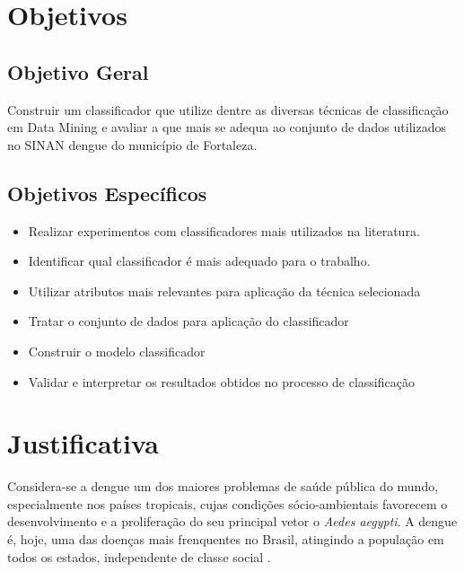 \documentclass[
	12pt,				%
	openright,			%
	oneside,	
	a4paper,				%
	english,				%
	brazil				%
]{abntex2/abntex2} %
\begin{document}
	\section{Objetivos}
	
		\subsection{Objetivo Geral}

		Construir um classificador que utilize dentre as diversas técnicas de classificação em Data Mining e avaliar a que mais se adequa ao conjunto de dados utilizados no SINAN dengue do município de Fortaleza. 
		
		\subsection{Objetivos Específicos}
		
		\begin{itemize}
			\item Realizar experimentos com classificadores mais utilizados na literatura.

			\item Identificar qual classificador é mais adequado para o trabalho.
			
			\item Utilizar atributos mais relevantes para aplicação da técnica selecionada
			
			\item Tratar o conjunto de dados para aplicação do classificador
			
			\item Construir o modelo classificador
			
			\item Validar e interpretar os resultados obtidos no processo de classificação
		\end{itemize}
		
	\section{Justificativa}
	
	Considera-se a dengue um dos maiores problemas de saúde pública do mundo, especialmente nos países tropicais, cujas condições sócio-ambientais favorecem o desenvolvimento e a proliferação do seu principal vetor o \textsl{Aedes aegypti}. A dengue é, hoje, uma das doenças mais frenquentes no Brasil, atingindo a população em todos os estados, independente de classe social \cite{saude:2008}.
	
\end{document}
